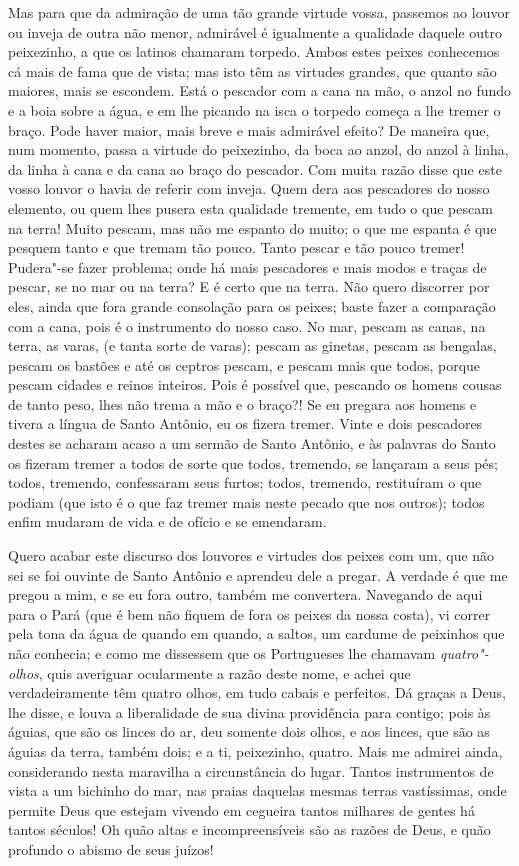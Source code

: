 Mas para que da admiração de uma tão grande virtude vossa, passemos ao
louvor ou inveja de outra não menor, admirável é igualmente a qualidade
daquele outro peixezinho, a que os latinos chamaram torpedo. Ambos estes
peixes conhecemos cá mais de fama que de vista; mas isto têm as virtudes
grandes, que quanto são maiores, mais se escondem. Está o pescador com a
cana na mão, o anzol no fundo e a boia sobre a água, e em lhe picando na
isca o torpedo começa a
lhe tremer o braço. Pode haver maior, mais breve e mais admirável
efeito? De maneira que, num momento, passa a virtude do peixezinho, da
boca ao anzol, do anzol à linha, da linha à cana e da cana ao braço do
pescador.
Com muita razão disse que este vosso louvor o havia de referir com
inveja. Quem dera aos pescadores do nosso elemento, ou quem lhes pusera
esta qualidade tremente, em tudo o que pescam na terra! Muito pescam,
mas não me espanto do muito; o que me espanta é que pesquem tanto e que
tremam tão pouco. Tanto pescar e tão pouco tremer!
Pudera"-se fazer problema; onde há mais pescadores e mais modos e traças
de pescar, se no mar ou na terra? E é certo que na terra. Não quero
discorrer por eles, ainda que fora grande consolação para os peixes;
baste fazer a comparação com a cana, pois é o instrumento do nosso caso.
No mar, pescam as canas, na terra, as varas, (e tanta sorte de varas);
pescam as ginetas, pescam as bengalas, pescam os bastões e até os
ceptros pescam, e pescam mais que todos, porque pescam cidades e reinos
inteiros. Pois é possível que, pescando os homens cousas de tanto peso,
lhes não trema a mão e o braço?! Se eu pregara aos homens e tivera a
língua de Santo Antônio, eu os fizera tremer.
Vinte e dois pescadores destes se acharam acaso a um sermão de Santo
Antônio, e às palavras do Santo os fizeram tremer a todos de sorte que
todos, tremendo, se lançaram a seus pés; todos, tremendo, confessaram
seus furtos; todos, tremendo, restituíram o que podiam (que isto é o que
faz tremer mais neste pecado que nos outros); todos enfim mudaram de
vida e de ofício e se emendaram.


Quero acabar este discurso dos louvores
e virtudes dos peixes com um, que não sei se foi ouvinte de Santo
Antônio e aprendeu dele a pregar. A verdade é que me pregou a mim, e se
eu fora outro, também me convertera. Navegando de aqui para o Pará (que
é bem não fiquem de fora os peixes da nossa costa), vi correr pela tona
da água de quando em quando, a saltos, um cardume de peixinhos que não
conhecia; e como me dissessem que os Portugueses lhe chamavam
\emph{quatro"-olhos}, quis averiguar ocularmente a razão deste nome, e
achei que verdadeiramente têm quatro olhos, em tudo cabais e perfeitos.
Dá graças a Deus, lhe disse, e louva a liberalidade de sua divina
providência para contigo; pois às águias, que são os linces do ar, deu
somente dois olhos, e aos linces, que são as águias da terra, também
dois; e a ti, peixezinho, quatro.
Mais me admirei ainda, considerando nesta maravilha a circunstância do
lugar. Tantos instrumentos de vista a um bichinho do mar, nas praias
daquelas mesmas terras vastíssimas, onde permite Deus que estejam
vivendo em cegueira tantos milhares de gentes há tantos séculos! Oh quão
altas e incompreensíveis são as razões de Deus, e quão profundo o abismo
de seus juízos!

